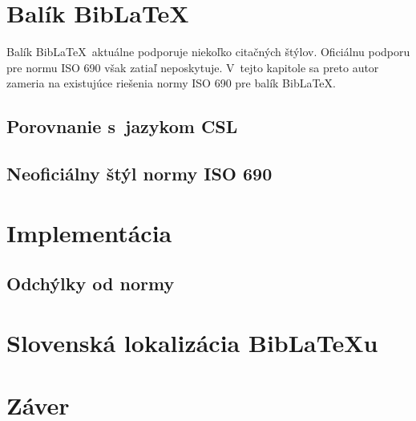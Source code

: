 \documentclass{fithesis3}
\begin{document}
\chapter{Balík Bib\LaTeX}
Balík Bib\LaTeX\, aktuálne podporuje niekoľko citačných štýlov. Oficiálnu podporu pre normu ISO 690 však zatiaľ neposkytuje. V~tejto kapitole sa preto autor zameria na existujúce riešenia normy ISO 690 pre balík Bib\LaTeX.

	\section{Porovnanie s~jazykom CSL}
	\section{Neoficiálny štýl normy ISO 690}

\chapter{Implementácia}
	\section{Odchýlky od normy}

\chapter{Slovenská lokalizácia Bib\LaTeX u}

\chapter{Záver}

\printbibliography[heading=bibintoc]
\end{document}
